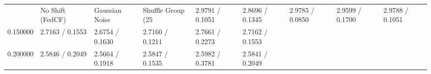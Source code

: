 \begin{tabular}{llllll}
\toprule
 & No Shift (FedCF) & Gaussian Noise & Shuffle Group (25%
 & 2.9791 / 0.1051 & 2.8696 / 0.1345 & 2.9785 / 0.0850 & 2.9599 / 0.1700 & 2.9788 / 0.1051 \\
0.150000 & 2.7163 / 0.1553 & 2.6754 / 0.1630 & 2.7160 / 0.1211 & 2.7661 / 0.2273 & 2.7162 / 0.1553 \\
0.200000 & 2.5846 / 0.2049 & 2.5664 / 0.1918 & 2.5847 / 0.1535 & 2.5982 / 0.3781 & 2.5841 / 0.2049 \\
\bottomrule
\end{tabular}
